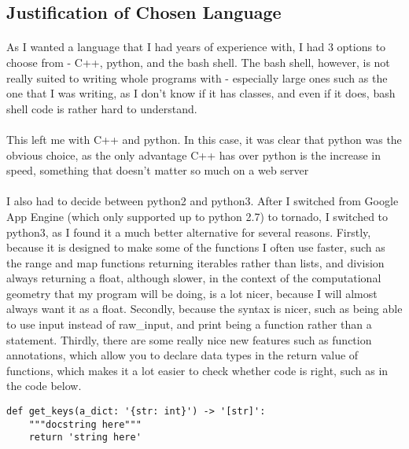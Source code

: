 \subsection{Justification of Chosen Language}
\paragraph{}
As I wanted a language that I had years of experience with, I had 3 options to choose from - C++, python, and the bash shell. The bash shell, however, is not really suited to writing whole programs with - especially large ones such as the one that I was writing, as I don't know if it has classes, and even if it does, bash shell code is rather hard to understand.

\paragraph{}
This left me with C++ and python. In this case, it was clear that python was the obvious choice, as the only advantage C++ has over python is the increase in speed, something that doesn't matter so much on a web server

\paragraph{}
I also had to decide between python2 and python3. After I switched from Google App Engine (which only supported up to python 2.7) to tornado, I switched to python3, as I found it a much better alternative for several reasons. Firstly, because it is designed to make some of the functions I often use faster, such as the range and map functions returning iterables rather than lists, and division always returning a float, although slower, in the context of the computational geometry that my program will be doing, is a lot nicer, because I will almost always want it as a float. Secondly, because the syntax is nicer, such as being able to use input instead of raw\_input, and print being a function rather than a statement. Thirdly, there are some really nice new features such as function annotations, which allow you to declare data types in the return value of functions, which makes it a lot easier to check whether code is right, such as in the code below.

\begin{verbatim}
def get_keys(a_dict: '{str: int}') -> '[str]':
    """docstring here"""
    return 'string here'
\end{verbatim}
